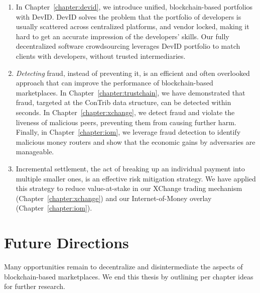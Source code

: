 \begin{enumerate}
	\item In Chapter~\ref{chapter:devid}, we introduce unified, blockchain-based portfolios with DevID.
	DevID solves the problem that the portfolio of developers is usually scattered across centralized platforms, and vendor locked, making it hard to get an accurate impression of the developers' skills.
	Our fully decentralized software crowdsourcing leverages DevID portfolio to match clients with developers, without trusted intermediaries.
	
	\item \emph{Detecting} fraud, instead of preventing it, is an efficient and often overlooked approach that can improve the performance of blockchain-based marketplaces.
	In Chapter~\ref{chapter:trustchain}, we have demonstrated that fraud, targeted at the ConTrib data structure, can be detected within seconds.
	In Chapter~\ref{chapter:xchange}, we detect fraud and violate the liveness of malicious peers, preventing them from causing further harm.
	Finally, in Chapter~\ref{chapter:iom}, we leverage fraud detection to identify malicious money routers and show that the economic gains by adversaries are manageable.
	
	\item Incremental settlement, the act of breaking up an individual payment into multiple smaller ones, is an effective risk mitigation strategy.
	We have applied this strategy to reduce value-at-stake in our XChange trading mechanism (Chapter~\ref{chapter:xchange}) and our Internet-of-Money overlay (Chapter~\ref{chapter:iom}).
	
\end{enumerate}

\section{Future Directions}
Many opportunities remain to decentralize and disintermediate the aspects of blockchain-based marketplaces.
We end this thesis by outlining per chapter ideas for further research.

